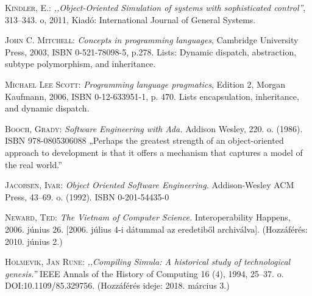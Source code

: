 \documentclass[]{thesis-ekf}
\theoremstyle{definition}
\begin{document}
	\begin{thebibliography}{1}
		 \textsc{Kindler, E.:} \emph{,,Object-Oriented Simulation of systems with sophisticated control''}, 313–343. o, 2011, Kiadó: International Journal of General Systems.
		
		 \textsc{John C. Mitchell:} \emph{Concepts in programming languages}, Cambridge University Press, 2003, ISBN 0-521-78098-5, p.278. Lists: Dynamic dispatch, abstraction, subtype polymorphism, and inheritance.
		
		 \textsc{Michael Lee Scott:} \emph{Programming language pragmatics}, Edition 2, Morgan Kaufmann, 2006, ISBN 0-12-633951-1, p. 470. Lists encapsulation, inheritance, and dynamic dispatch.
		
		 \textsc{Booch, Grady:} \emph{Software Engineering with Ada.} Addison Wesley, 220. o. (1986). ISBN 978-0805306088 „Perhaps the greatest strength of an object-oriented approach to development is that it offers a mechanism that captures a model of the real world.”
		
		 \textsc{Jacobsen, Ivar:} \emph{Object Oriented Software Engineering.} Addison-Wesley ACM Press, 43–69. o. (1992). ISBN 0-201-54435-0
		
		 \textsc{Neward, Ted:} \emph{The Vietnam of Computer Science.} Interoperability Happens, 2006. június 26. [2006. július 4-i dátummal az eredetiből archiválva]. (Hozzáférés: 2010. június 2.)
		
		 \textsc{Holmevik, Jan Rune:} \emph{,,Compiling Simula: A historical study of technological genesis.''} IEEE Annals of the History of Computing 16 (4), 1994, 25–37. o. DOI:10.1109/85.329756. (Hozzáférés ideje: 2018. március 3.)
	\end{thebibliography}
\end{document}
